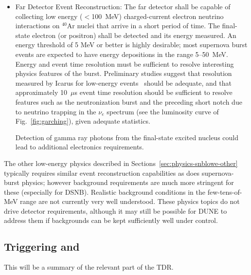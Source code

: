 \begin{itemize}
\item Far Detector Event Reconstruction:   
The far detector shall be capable of collecting low energy ($<$\SI{100}{\MeV})  charged-current electron neutrino interactions on $^{40}$Ar nuclei that arrive in a short period of time. The final-state electron (or positron) shall be detected and its energy measured.   An energy threshold of 5 MeV or better is highly desirable; most supernova burst events are expected to have energy depositions in the range 5--50~MeV.
Energy and event time resolution must be sufficient to resolve
interesting physics features of the burst.  Preliminary studies
suggest that resolution measured by Icarus for low-energy
events~\cite{Amoruso:2003sw} should be adequate, and that
approximately 10~$\mu$s event time resolution should be sufficient to resolve features such as the neutronization burst and the preceding short notch due to neutrino trapping in the $\nu_e$ spectrum (see the luminosity curve of Fig.~\ref{fig:garching}), given adequate statistics.   

Detection of gamma ray photons from the final-state excited nucleus could lead to additional electronics requirements.  

\end{itemize}



The other low-energy physics described in Sections~\ref{sec:physics-snblowe-other} typically requires similar event reconstruction capabilities as does supernova-burst physics; however background requirements are much more stringent for these (especially for DSNB).  Realistic background conditions in the few-tens-of-MeV range are not currently  very well understood.  
These physics topics do not drive detector requirements, although it may still be possible for DUNE to address them if backgrounds can be kept sufficiently well under control.




\subsection{Triggering and }

This will be a summary of the relevant part of the TDR.


